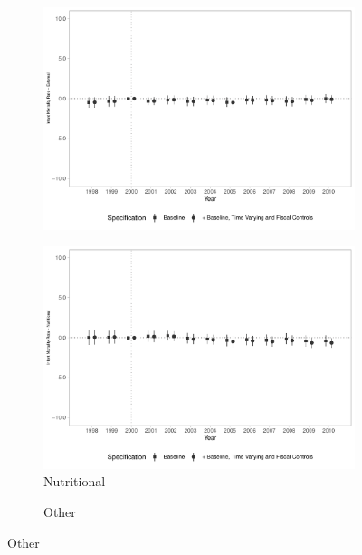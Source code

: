 \begin{figure}[h!]
\begin{center}
\begin{subfigure}{0.32\textwidth}
        \includegraphics[width=\textwidth]{plots/tx_mi_ext_dist_ec29_baseline_dist_ec29_baseline_18.pdf}
    \end{subfigure}
        \begin{subfigure}{0.32\textwidth}
        \centering
        \caption{\scriptsize Nutritional}\label{fig:18f}
        \includegraphics[width=\textwidth]{plots/tx_mi_nut_dist_ec29_baseline_dist_ec29_baseline_18.pdf}
    \end{subfigure}
        \begin{subfigure}{0.32\textwidth}
        \centering
        \caption{\scriptsize Other}\label{fig:18g}

\end{subfigure}
\end{center}
\end{figure}
